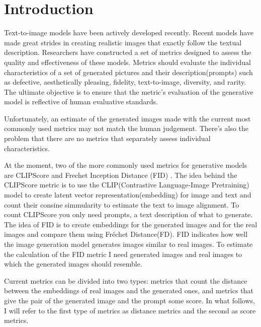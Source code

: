 \chapter{Introduction}
\label{chap:intro}

Text-to-image models have been actively developed recently.  Recent models \cite{Imagen}\cite{PixArt}\cite{Latent_Diffusion}\cite{Casceded_Diffusion}\cite{Stable_Duffusion} have made great strides in creating realistic images that exactly follow the textual description. Researchers have constructed a set of metrics designed to assess the quality and effectiveness of these models. Metrics should evaluate the individual characteristics of a set of generated pictures and their description(prompts) such as defective, aesthetically pleasing, fidelity, text-to-image, diversity, and rarity. The ultimate objective is to ensure that the metric's evaluation of the generative model is reflective of human evaluative standards.

Unfortunately, an estimate of the generated images made with the current most commonly used metrics may not match the human judgement. There's also the problem that there are no metrics that separately assess individual characteristics.

At the moment, two of the more commonly used metrics for generative models are CLIPScore \cite{CLIPScore} and Frechet Inception Distance (FID) \cite{FID}. The idea behind the CLIPScore metric is to use the CLIP(Contrastive Language-Image Pretraining) \cite{CLIP} model to create latent vector representation(embedding) for image and text and count their consine simmularity to estimate the text to image alignment. To count CLIPScore you only need prompts, a text description of what to generate. The idea of FID is to create embeddings for the generated images and for the real images and compare them using Fréchet Distance(FD). FID indicates how well the image generation model generates images similar to real images. To estimate the calculation of the FID metric I need generated images and real images to which the generated images should resemble.


Current metrics can be divided into two types: metrics that count the distance between the embeddings of real images and the generated ones, and metrics that give the pair of the generated image and the prompt some score. In what follows, I will refer to the first type of metrics as distance metrics and the second as score metrics.

